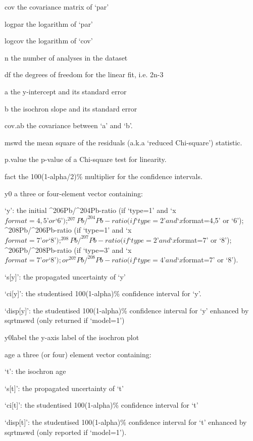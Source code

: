      cov the covariance matrix of ‘par’

     logpar the logarithm of ‘par’

     logcov the logarithm of ‘cov’

     n the number of analyses in the dataset

     df the degrees of freedom for the linear fit, i.e. 2n-3

     a the y-intercept and its standard error

     b the isochron slope and its standard error

     cov.ab the covariance between ‘a’ and ‘b’.

     mswd the mean square of the residuals (a.k.a `reduced Chi-square')
          statistic.

     p.value the p-value of a Chi-square test for linearity.

     fact the 100(1-alpha/2)\% multiplier for the confidence intervals.

     y0 a three or four-element vector containing:

          ‘y’: the initial ^{206}Pb/^{204}Pb-ratio (if ‘type=1’ and
          ‘x$format=4,5’ or ‘6’); ^{207}Pb/^{204}Pb-ratio (if ‘type=2’
          and ‘x$format=4,5’ or ‘6’); ^{208}Pb/^{206}Pb-ratio (if
          ‘type=1’ and ‘x$format=7’ or ‘8’); ^{208}Pb/^{207}Pb-ratio
          (if ‘type=2’ and ‘x$format=7’ or ‘8’);
          ^{206}Pb/^{208}Pb-ratio (if ‘type=3’ and ‘x$format=7’ or
          ‘8’); or ^{207}Pb/^{208}Pb-ratio (if ‘type=4’ and
          ‘x$format=7’ or ‘8’).

          ‘s[y]’: the propagated uncertainty of ‘y’

          ‘ci[y]’: the studentised 100(1-alpha)\% confidence interval
          for ‘y’.

          ‘disp[y]’: the studentised 100(1-alpha)\% confidence interval
          for ‘y’ enhanced by sqrt{mswd} (only returned if ‘model=1’)

     y0label the y-axis label of the isochron plot

     age a three (or four) element vector containing:

          ‘t’: the isochron age

          ‘s[t]’: the propagated uncertainty of ‘t’

          ‘ci[t]’: the studentised 100(1-alpha)\% confidence interval
          for ‘t’

          ‘disp[t]’: the studentised 100(1-alpha)\% confidence interval
          for ‘t’ enhanced by sqrt{mswd} (only reported if ‘model=1’).

